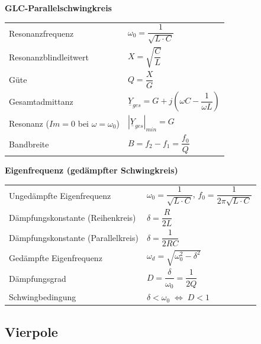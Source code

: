 \documentclass[a4paper,12pt]{scrartcl}
\begin{document}
\newpage

\noindent\textbf{GLC-Parallelschwingkreis}

\begin{tabular}{@{} l l @{}}
\hspace*{20mm} Resonanzfrequenz & $\omega_0 = \dfrac{1}{\sqrt{L\cdot C}}$ \\
\hspace*{20mm} Resonanzblindleitwert & $X = \sqrt{\dfrac{C}{L}}$ \\
\hspace*{20mm} Güte & $Q = \dfrac{X}{G}$ \\
\hspace*{20mm} Gesamtadmittanz & $\underline{Y}_{ges} = G + j\!\left(\omega C - \dfrac{1}{\omega L}\right)$ \\
\hspace*{20mm} Resonanz ($Im = 0$ bei $\omega = \omega_0$) & $|\underline{Y}_{ges}|_{min} = G$ \\
\hspace*{20mm} Bandbreite & $B = f_2 - f_1 = \dfrac{f_0}{Q}$ \\
\end{tabular}

\vspace*{3mm}
\noindent\textbf{Eigenfrequenz (gedämpfter Schwingkreis)}

\begin{tabular}{@{} l l @{}}
\hspace*{20mm} Ungedämpfte Eigenfrequenz & $\omega_0 = \dfrac{1}{\sqrt{L\cdot C}}$, \quad $f_0 = \dfrac{1}{2\pi\sqrt{L\cdot C}}$ \\
\hspace*{20mm} Dämpfungskonstante (Reihenkreis) & $\delta = \dfrac{R}{2L}$ \\
\hspace*{20mm} Dämpfungskonstante (Parallelkreis) & $\delta = \dfrac{1}{2RC}$ \\
\hspace*{20mm} Gedämpfte Eigenfrequenz & $\omega_d = \sqrt{\omega_0^2 - \delta^2}$ \\
\hspace*{20mm} Dämpfungsgrad & $D = \dfrac{\delta}{\omega_0} = \dfrac{1}{2Q}$ \\
\hspace*{20mm} Schwingbedingung & $\delta < \omega_0 \;\Leftrightarrow\; D < 1$ \\
\end{tabular}


\subsection{Vierpole}
\end{document}
